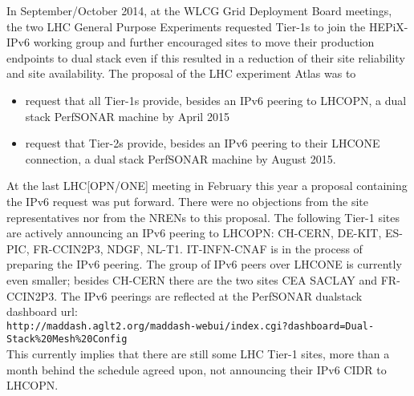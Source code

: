 In September/October 2014, at the WLCG Grid Deployment Board meetings, the two LHC General Purpose Experiments  requested Tier-1s to join the HEPiX-IPv6 working group and further encouraged sites to move their production endpoints to dual stack even if this resulted in a reduction of their site reliability and site availability. The proposal of the LHC experiment Atlas was to
\begin{itemize}
 \item request that all Tier-1s provide,
	besides an IPv6 peering to LHCOPN,
        a dual stack PerfSONAR machine by April 2015
 \item request that Tier-2s provide,
        besides an IPv6 peering to their LHCONE connection,
        a dual stack PerfSONAR machine by August 2015.
\end{itemize}
At the last LHC[OPN/ONE] meeting in February this year a proposal containing the IPv6 request was put forward. There were no objections from the site representatives nor from the NRENs to this proposal. The following Tier-1 sites are actively announcing an IPv6 peering to LHCOPN: CH-CERN, DE-KIT, ES-PIC, FR-CCIN2P3, NDGF, NL-T1. IT-INFN-CNAF is in the process of preparing the IPv6 peering. The group of IPv6 peers over LHCONE is currently even smaller; besides CH-CERN there are the two sites CEA SACLAY and FR-CCIN2P3.
The IPv6 peerings are reflected at the PerfSONAR dualstack dashboard url:\\{\tt\small http://maddash.aglt2.org/maddash-webui/index.cgi?dashboard=Dual-Stack\%20Mesh\%20Config} \\ This currently implies that there are still some LHC Tier-1 sites, more than a month behind the schedule agreed upon, not announcing their IPv6 CIDR to LHCOPN.

